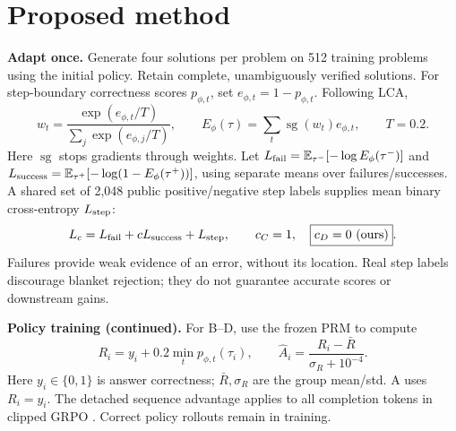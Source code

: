 \documentclass{article}
\newcommand{\E}{\mathbb{E}}
\newcommand{\sg}{\operatorname{sg}}
\begin{document}
\section{Proposed method}
\textbf{Adapt once.} Generate four solutions per problem on 512 training problems using the initial policy. Retain complete, unambiguously verified solutions. For step-boundary correctness scores $p_{\phi,t}$, set $e_{\phi,t}=1-p_{\phi,t}$. Following LCA,
\begin{equation}
 w_t=\frac{\exp(e_{\phi,t}/T)}{\sum_j\exp(e_{\phi,j}/T)},\qquad
 E_\phi(\tau)=\sum_t\sg(w_t)e_{\phi,t},\qquad T=0.2 .
\end{equation}
Here $\sg$ stops gradients through weights. Let $L_{\rm fail}=\E_{\tau^-}[-\log E_\phi(\tau^-)]$ and $L_{\rm success}=\E_{\tau^+}[-\log(1-E_\phi(\tau^+))]$, using separate means over failures/successes. A shared set of 2,048 public positive/negative step labels supplies mean binary cross-entropy $L_{\rm step}$:
\begin{equation}
 L_c=L_{\rm fail}+cL_{\rm success}+L_{\rm step},\qquad
 c_C=1,\quad \boxed{c_D=0\ \text{(ours)}} .
\end{equation}
Failures provide weak evidence of an error, without its location. Real step labels discourage blanket rejection; they do not guarantee accurate scores or downstream gains.

\newpage
\noindent\textbf{Policy training (continued).} For B--D, use the frozen PRM to compute
\begin{equation}
 R_i=y_i+0.2\min_t p_{\phi,t}(\tau_i),\qquad
 \hat A_i=\frac{R_i-\bar R}{\sigma_R+10^{-4}} .
\end{equation}
Here $y_i\in\{0,1\}$ is answer correctness; $\bar R,\sigma_R$ are the group mean/std. A uses $R_i=y_i$. The detached sequence advantage applies to all completion tokens in clipped GRPO \citep{shao2024}. Correct policy rollouts remain in training.
\end{document}
